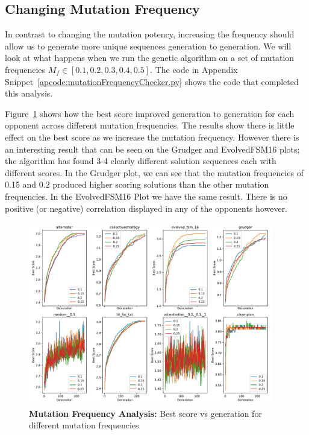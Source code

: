 \subsection{Changing Mutation Frequency}\label{subsec:changingMutationFrequency}
In contrast to changing the mutation potency, increasing the frequency should allow us to generate more unique sequences generation to generation.
We will look at what happens when we run the genetic algorithm on a set of mutation frequencies \(M_f \in [0.1,0.2,0.3,0.4,0.5]\).
The code in Appendix Snippet~\ref{apcode:mutationFrequencyChecker.py} shows the code that completed this analysis.

Figure~\ref{fig:MUT-FREQ-bs-v-gen-all} shows how the best score improved generation to generation for each opponent across different mutation frequencies.
The results show there is little effect on the best score as we increase the mutation frequency.
However there is an interesting result that can be seen on the Grudger and EvolvedFSM16 plots; the algorithm has found 3-4 clearly different solution sequences each with different scores.
In the Grudger plot, we can see that the mutation frequencies of 0.15 and 0.2 produced higher scoring solutions than the other mutation frequencies.
In the EvolvedFSM16 Plot we have the same result.
There is no positive (or negative) correlation displayed in any of the opponents however.

\begin{figure}[ht]
    \includegraphics[width=0.95\textwidth, keepaspectratio, center]{./img/plots/MUT_FREQ_bs_v_gen_all.pdf}
    \caption{\textbf{Mutation Frequency Analysis:} Best score vs generation for different mutation frequencies}\label{fig:MUT-FREQ-bs-v-gen-all}
\end{figure}


